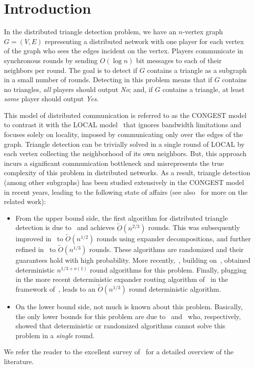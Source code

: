 \documentclass[11pt]{article}
\theoremstyle{definition}
\newcommand{\Ot}{\ensuremath{\widetilde{O}}}
\begin{document}
\section{Introduction}\label{sec:intro}

In the distributed triangle detection problem, we have an $n$-vertex graph $G=(V,E)$ representing a distributed network with one player for each vertex of the graph who sees the edges incident on the vertex. Players communicate in synchronous rounds 
by sending $O(\log{n})$ bit messages to each of their neighbors per round. The goal is to detect if $G$ contains a triangle as a subgraph in a small number of rounds. Detecting in this problem means that if $G$ contains no triangles, \emph{all} players should output \emph{No}; and, if $G$ contains a triangle, at least \emph{some} player should output \emph{Yes}. 

This model of distributed communication is referred
to as the CONGEST model~\cite{Peleg00} to contrast it with the LOCAL model~\cite{Linial92} that ignores bandwidth limitations and focuses solely on locality, imposed by communicating only over the edges of the graph. Triangle detection
can be trivially solved in a single round of LOCAL by each vertex collecting the neighborhood of its own neighbors. But, this approach incurs a significant communication bottleneck and misrepresents the true complexity of 
this problem in distributed networks. As a result, triangle detection (among other subgraphs) has been studied extensively in the CONGEST model in recent years, leading to the following state of affairs (see also~ for more on the related work): 
\vspace{-3pt}
\begin{itemize}
	\item From the upper bound side, the first algorithm for distributed triangle detection is due to~\cite{IzumiG17} and achieves $\Ot(n^{2/3})$ rounds. This was subsequently improved 
	in~\cite{ChangPZ19} to $\Ot(n^{1/2})$ rounds using expander decompositions, and further refined in~\cite{ChangS19} to $\Ot(n^{1/3})$ rounds. These algorithms are randomized
	and their guarantees hold with high probability. More recently,~\cite{CHLV22}, building on~\cite{ChangS20}, obtained deterministic $n^{1/3+o(1)}$ round algorithms for this problem. Finally, plugging in 
	the more recent deterministic expander routing algorithm of~\cite{ChangHS24} in the framework of~\cite{CHLV22}, leads to an $\Ot(n^{1/3})$ round deterministic algorithm. 
	
	\item On the lower bound side, not much is known about this problem. Basically, the only lower bounds for this problem are due to~\cite{AbboudCKL20} and~\cite{FischerGKO18} who, respectively, 
	showed that deterministic or randomized algorithms cannot solve this problem in a  \emph{single} round. 
\end{itemize}
\vspace{-3pt}
We refer the reader to the excellent survey of~\cite{CH22} for a detailed overview of the literature. 
\end{document}
